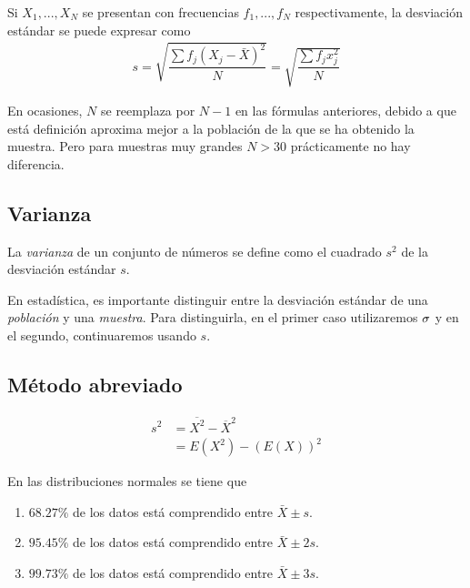 Si $X_{1},...,X_{N}$ se presentan con frecuencias $f_{1},...,f_{N}$ respectivamente, la desviación estándar se puede expresar como
\begin{align}
	s=\sqrt{\dfrac{\sum f_{j}\left( X_{j}-\bar{X} \right)^{2}}{N}}=\sqrt{\dfrac{\sum f_{j}x_{j}^{2}}{N}}
\end{align}


\begin{observacion}
	En ocasiones, $N$ se reemplaza por $N-1$ en las fórmulas anteriores, debido a que está definición aproxima mejor a la población de la que se ha obtenido la muestra. Pero para muestras muy grandes $N>30$ prácticamente no hay diferencia.
\end{observacion}


\subsection{Varianza}
La \emph{varianza} de un conjunto de números se define como el cuadrado $s^{2}$ de la desviación estándar $s$.


\begin{observacion}
	En estadística, es importante distinguir entre la desviación estándar de una \emph{población} y una \emph{muestra}. Para distinguirla, en el primer caso utilizaremos $\sigma$ y en el segundo, continuaremos usando $s.$
\end{observacion}


\subsection{Método abreviado}
\begin{align}
	s^{2}&=\overline{X^{2}}-\overline{X}^{2} \\
	&= E(X^2)-\left( E(X) \right)^{2}
\end{align}



En las distribuciones normales se tiene que
\begin{enumerate}
	\item $68.27\%$ de los datos está comprendido entre $\bar{X}\pm s.$
	\item $95.45\%$ de los datos está comprendido entre $\bar{X}\pm 2s.$
	\item $99.73\%$ de los datos está comprendido entre $\bar{X}\pm 3s.$
	
\end{enumerate}



